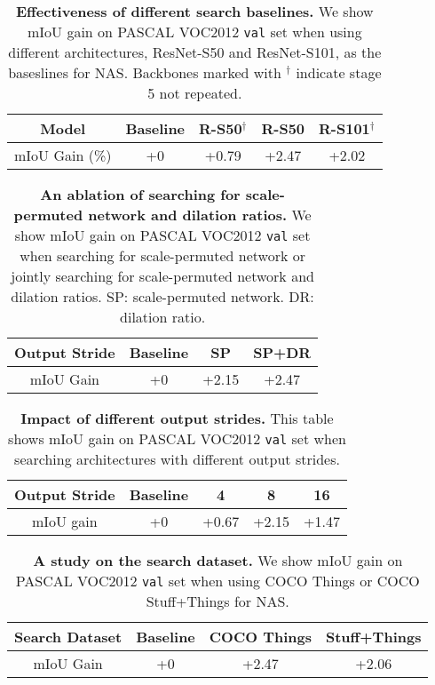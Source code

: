 \documentclass[10pt,twocolumn,letterpaper]{article}
\begin{document}
\setlength{\tabcolsep}{4pt}
\begin{table}[h!]
\centering
\begin{tabular}{c| c | ccc }
  \toprule
  Model &  Baseline & R-S50$^\dagger$ & R-S50 & R-S101$^\dagger$  \\
  \midrule
  mIoU Gain (\%) & +0 & +0.79 & +2.47 & +2.02\\
  \bottomrule
\end{tabular}
\caption{\textbf{Effectiveness of different search baselines.} We show mIoU gain on PASCAL VOC2012 \texttt{val} set when using different architectures, ResNet-S50 and ResNet-S101, as the baseslines for NAS. Backbones marked with $^\dagger$ indicate stage 5 not repeated.}
\label{tab:search_models} 
\end{table}
\setlength{\tabcolsep}{4pt}
\begin{table}[h!]
\centering
\begin{tabular}{c| c |c c}
  \toprule
  Output Stride & Baseline & SP & SP+DR  \\
  \midrule
  mIoU Gain & +0 & +2.15 & +2.47 \\
  \bottomrule
\end{tabular}
\caption{\textbf{An ablation of searching for scale-permuted network and dilation ratios.} We show mIoU gain on PASCAL VOC2012 \texttt{val} set when searching for scale-permuted network or jointly searching for scale-permuted network and dilation ratios. SP: scale-permuted network. DR: dilation ratio.}
\label{tab:search_perm_dils} 
\end{table}
\setlength{\tabcolsep}{4pt}
\begin{table}[h!]
\centering
\begin{tabular}{c| c |c c c}
  \toprule
  Output Stride & Baseline & 4 & 8 & 16  \\
  \midrule
  mIoU gain & +0 & +0.67 & +2.15 & +1.47 \\
  \bottomrule
\end{tabular}
\caption{\textbf{Impact of different output strides.} This table shows mIoU gain on PASCAL VOC2012 \texttt{val} set when searching architectures with different output strides.}
\label{tab:search_os} 
\end{table}
\setlength{\tabcolsep}{4pt}
\begin{table}[h!]
\centering
\begin{tabular}{c| c |c c}
  \toprule
  Search Dataset & Baseline & COCO Things & Stuff+Things  \\
  \midrule
  mIoU Gain & +0 & +2.47 & +2.06 \\
  \bottomrule
\end{tabular}
\caption{\textbf{A study on the search dataset.} We show mIoU gain on PASCAL VOC2012 \texttt{val} set when using COCO Things or COCO Stuff+Things for NAS.}
\label{tab:search_coco} 
\end{table}
\end{document}
